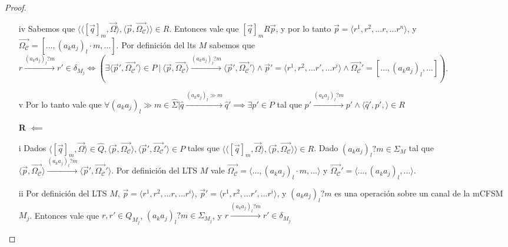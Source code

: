 \begin{proof}
\begin{itemize}
    \item[iv] Sabemos que $\langle \langle [\overrightarrow{q}]_m, \overrightarrow{\Omega} \rangle, \langle \overrightarrow{p}, \overrightarrow{\Omega_\mathcal{C}} \rangle \rangle \in R$. Entonces vale que $[\overrightarrow{q}]_mR\overrightarrow{p}$, y por lo tanto $\overrightarrow{p} = \langle r^1, r^2, \ldots r, \ldots r^n \rangle$, y $\overrightarrow{\Omega_\mathcal{C}} = [\ldots, (a_ka_j)_l \cdot m, \ldots]$. Por definición del lts $M$ sabemos que $r \xrightarrow{(a_ka_j)_l?m} r' \in \delta_{M_j}  \iff (\exists \langle \overrightarrow{p}', \overrightarrow{\Omega_\mathcal{C}}' \rangle \in P \ | \ \langle \overrightarrow{p}, \overrightarrow{\Omega_\mathcal{C}} \rangle \xrightarrow{(a_ka_j)_l?m} \langle \overrightarrow{p}', \overrightarrow{\Omega_\mathcal{C}}' \rangle \land \overrightarrow{p}'= \langle r^1, r^2, \ldots r', \ldots r^i \rangle \land \overrightarrow{\Omega_\mathcal{C}}'= [\ldots, (a_ka_j)_l, \ldots])$.
    
    \item[v] Por lo tanto vale que $\forall (a_ka_j)_l \gg m \in \hat{\Sigma} | \hat{q} \xrightarrow{(a_ka_j)_l \gg m} \hat{q}' \implies \exists p' \in P$ tal que $p' \xrightarrow{(a_ka_j)_l?m} p' \land \langle \hat{q}', p', \rangle \in R$
    
    \item[\textbf{R} $\impliedby$]
    
    \item[i]Dados $\langle [\overrightarrow{q}]_m, \overrightarrow{\Omega} \rangle \in \hat{Q}, \langle \overrightarrow{p}, \overrightarrow{\Omega_\mathcal{C}} \rangle, \langle \overrightarrow{p}', \overrightarrow{\Omega_\mathcal{C}}' \rangle \in P$ tales que $\langle \langle [\overrightarrow{q}]_m, \overrightarrow{\Omega} \rangle, \langle \overrightarrow{p}, \overrightarrow{\Omega_\mathcal{C}} \rangle \rangle \in R$. Dado $(a_ka_j)_l?m \in \Sigma_M$ tal que $\langle \overrightarrow{p}, \overrightarrow{\Omega_\mathcal{C}} \rangle \xrightarrow{(a_ka_j)_l?m} \langle \overrightarrow{p}', \overrightarrow{\Omega_\mathcal{C}}' \rangle$. Por definición del LTS $M$ vale $\overrightarrow{\Omega_{\mathcal{C}}}= \langle \ldots,(a_ka_j)_l \cdot m, \ldots \rangle$ y $\overrightarrow{\Omega_{\mathcal{C}}}'= \langle \ldots,(a_ka_j)_l, \ldots \rangle$.
    
    \item[ii] Por definición del LTS $M$, $\overrightarrow{p} = \langle r^1, r^2, \ldots r, \ldots r^i \rangle$, $\overrightarrow{p}' = \langle r^1, r^2, \ldots r', \ldots r^i \rangle$, y $(a_ka_j)_l?m$ es una operación sobre un canal de la mCFSM $M_j$. Entonces vale que $r,r' \in Q_{M_j}$, $(a_ka_j)_l?m \in \Sigma_{M_j}$, y $r \xrightarrow{(a_ka_j)_l?m} r' \in \delta_{M_j}$
    

\end{itemize}
\end{proof}
